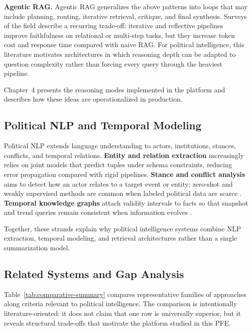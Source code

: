 \textbf{Agentic RAG.} Agentic RAG generalizes the above patterns into loops that may include planning, routing, iterative retrieval, critique, and final synthesis. Surveys of the field describe a recurring trade-off: iterative and reflective pipelines improve faithfulness on relational or multi-step tasks, but they increase token cost and response time compared with naive RAG. For political intelligence, this literature motivates architectures in which reasoning depth can be adapted to question complexity rather than forcing every query through the heaviest pipeline.

Chapter~4 presents the reasoning modes implemented in the platform and describes how these ideas are operationalized in production.

\subsection{Political NLP and Temporal Modeling}

Political NLP extends language understanding to actors, institutions, stances, conflicts, and temporal relations. \textbf{Entity and relation extraction} increasingly relies on joint models that predict tuples under schema constraints, reducing error propagation compared with rigid pipelines. \textbf{Stance and conflict analysis} aims to detect how an actor relates to a target event or entity; zero-shot and weakly supervised methods are common when labeled political data are scarce \cite{allaway-stance}. \textbf{Temporal knowledge graphs} attach validity intervals to facts so that snapshot and trend queries remain consistent when information evolves \cite{trivedi-hyte}.

Together, these strands explain why political intelligence systems combine NLP extraction, temporal modeling, and retrieval architectures rather than a single summarization model.

\subsection{Related Systems and Gap Analysis}

Table~\ref{tab:comparative-summary} compares representative families of approaches along criteria relevant to political intelligence. The comparison is intentionally literature-oriented: it does not claim that one row is universally superior, but it reveals structural trade-offs that motivate the platform studied in this PFE.

